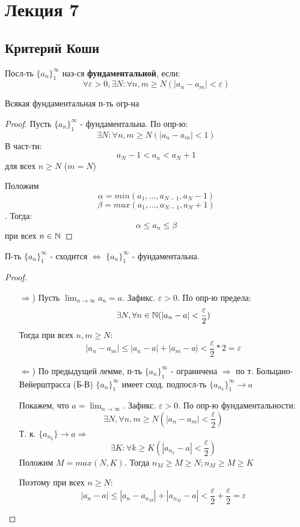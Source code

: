 \section{Лекция 7}
\subsection{Критерий Коши}
\begin{definition}
Посл-ть $\{a_n\}_{1}^{\infty}$ наз-ся \textbf{фундаментальной}, если:
\[
\forall \varepsilon > 0, \exists N \colon \forall n, m \geq N (\left|a_n - a_m\right| < \varepsilon)
\]
\end{definition}
\begin{lemma}
Всякая фундаментальная п-ть огр-на
\end{lemma}
\begin{proof}
Пусть $\{a_n\}_{1}^{\infty}$ - фундаментальна. По опр-ю:
\[
  \exists N \colon \forall n, m \geq N (\left|a_n - a_m\right| < 1)
\]
В част-ти:
\[
a_N - 1 < a_n < a_N + 1
\]
для всех $n \geq N$ ($m = N$)

Положим
\[
  \alpha = min(a_1, \ldots, a_{N - 1}, a_N - 1)
\]
\[
  \beta = max(a_1, \ldots, a_{N - 1}, a_{N} + 1)
\]
. Тогда:
\[
\alpha \leq a_n \leq \beta
\]
при всех $n \in \mathbb{N}$
\end{proof}
\begin{theorem}[Коши]
П-ть $\{a_n\}_{1}^{\infty}$ - сходится $\iff$ $\{a_n\}_{1}^{\infty}$ - фундаментальна.
\end{theorem}
\begin{proof}
\begin{itemize}
  \item[$\Rightarrow$)] Пусть $\lim_{n\to\infty} a_n = a$. Зафикс. $\varepsilon > 0$. По опр-ю предела:
    \[
    \exists N, \forall n \in \mathbb{N} (\left|a_n - a\right| < \frac{\varepsilon}{2})
    \]
    Тогда при всех $n, m \geq N$:
    \[
    \left|a_n - a_m\right| \leq \left|a_n - a\right| + \left|a_m - a\right| < \frac{\varepsilon}{2} * 2 = \varepsilon
    \]
  \item [$\Leftarrow$)] По предыдущей лемме, п-ть $\{a_n\}_{1}^{\infty}$ - ограничена $\Rightarrow$ по т. Больцано-Вейерштрасса (Б-В) $\{a_n\}_{1}^{\infty}$ имеет сход. подпосл-ть $\{a_{n_k}\}_{1}^{\infty} \rightarrow a$

    Покажем, что $a = \lim_{n\to\infty}$. Зафикс. $\varepsilon > 0$. По опр-ю фундаментальности:
    \[
    \exists N, \forall n, m \geq N (\left|a_n - a_m\right| < \frac{\varepsilon}{2})
    \]
    Т. к. $\{a_{n_k}\} \rightarrow a \Rightarrow$
    \[
    \exists K \colon \forall k \geq K (\left|a_{n_k} - a\right| < \frac{\varepsilon}{2})
    \]
    Положим $M = max(N, K)$. Тогда $n_M \geq M \geq N; n_M \geq M \geq K$

    Поэтому при всех $n \geq N$:
    \[
    \left|a_n - a\right| \leq \left|a_n - a_{n_M}\right| + \left|a_{n_M} - a\right| < \frac{\varepsilon}{2} + \frac{\varepsilon}{2} = \varepsilon
    \]

\end{itemize}
\end{proof}
